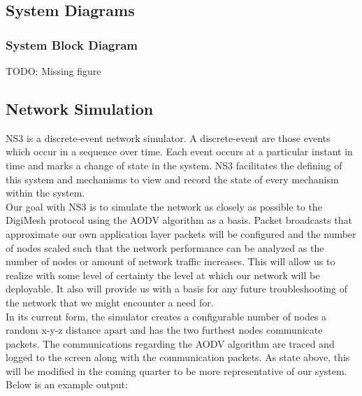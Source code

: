\documentclass[journal,compsoc]{IEEEtran}
\begin{document}
\subsection{System Diagrams}

\subsubsection{System Block Diagram}

TODO: Missing figure

\subsection{Network Simulation}

NS3 is a discrete-event network simulator. A discrete-event are those events which occur in a sequence over time. Each event occurs at a particular instant in time and marks a change of state in the system. NS3 facilitates the defining of this system and mechanisms to view and record the state of every mechanism within the system.\\

Our goal with NS3 is to simulate the network as closely as possible to the DigiMesh protocol using the AODV algorithm as a basis. Packet broadcasts that approximate our own application layer packets will be configured and the number of nodes scaled such that the network performance can be analyzed as the number of nodes or amount of network traffic increases. This will allow us to realize with some level of certainty the level at which our network will be deployable. It also will provide us with a basis for any future troubleshooting of the network that we might encounter a need for.\\

In its current form, the simulator creates a configurable number of nodes a random x-y-z distance apart and has the two furthest nodes communicate packets. The communications regarding the AODV algorithm are traced and logged to the screen along with the communication packets. As state above, this will be modified in the coming quarter to be more representative of our system.\\

Below is an example output:
\end{document}
